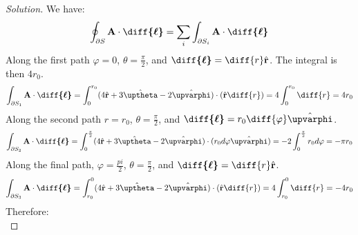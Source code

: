\documentclass[crop=false,class=article,oneside]{standalone}
\begin{document}
        \begin{proof}[Solution]
            We have:
            \begin{equation*}
                \oint_{\partial S}
                \mathbf{A}\cdot\boldsymbol{\diff{\ell}}
                =\sum_{i}\int_{\partial{S_{i}}}
                \mathbf{A}\cdot\boldsymbol{\diff{\ell}}
            \end{equation*}
            Along the first path $\varphi=0$, $\theta=\frac{\pi}{2}$,
            and
            $\boldsymbol{\diff{\ell}}=\diff{r}\hat{\mathbf{r}}$.
            The integral is then $4r_{0}$.
            \begin{equation*}
                \int_{\partial S_{1}}
                \mathbf{A}\cdot\boldsymbol{\diff{\ell}}
                =\int_{0}^{r_{0}}
                (4\hat{\mathbf{r}}
                +3\hat{\boldsymbol{\uptheta}}
                -2\hat{\boldsymbol{\upvarphi}})
                \cdot(\hat{\mathbf{r}}\diff{r})
                =4\int_{0}^{r_{0}}\diff{r}
                =4r_{0}
            \end{equation*}
            Along the second path $r=r_{0}$,
            $\theta=\frac{\pi}{2}$, and 
            $\boldsymbol{\diff{\ell}}%
             =r_{0}\diff{\varphi}\hat{\boldsymbol{\upvarphi}}$.
            \begin{equation*}
                \int_{\partial S_{2}}
                \mathbf{A}\cdot\boldsymbol{\diff{\ell}}
                =\int_{0}^{\frac{\pi}{2}}(4\hat{\mathbf{r}}
                +3\hat{\boldsymbol{\uptheta}}
                -2\hat{\boldsymbol{\upvarphi}})
                \cdot(r_{0}d\varphi\hat{\boldsymbol{\upvarphi}})
                =-2\int_{0}^{\frac{\pi}{2}}r_{0}d\varphi
                =-\pi r_{0}
            \end{equation*}
            Along the final path, $\varphi=\frac{pi}{2}$,
            $\theta=\frac{\pi}{2}$, and
            $\boldsymbol{\diff{\ell}}=\diff{r}\hat{\mathbf{r}}$.
            \begin{equation*}
                \int_{\partial S_{3}}
                \mathbf{A}\cdot\boldsymbol{\diff{\ell}}
                =\int_{r_{0}}^{0}
                (4\hat{\mathbf{r}}
                 +3\hat{\boldsymbol{\uptheta}}
                 -2\hat{\boldsymbol{\upvarphi}})
                \cdot(\hat{\mathbf{r}}\diff{r})
                =4\int_{r_{0}}^{0}\diff{r}
                =-4r_{0}
            \end{equation*}
            Therefore:
            \begin{equation*}

\end{equation*}
\end{proof}
\end{document}
